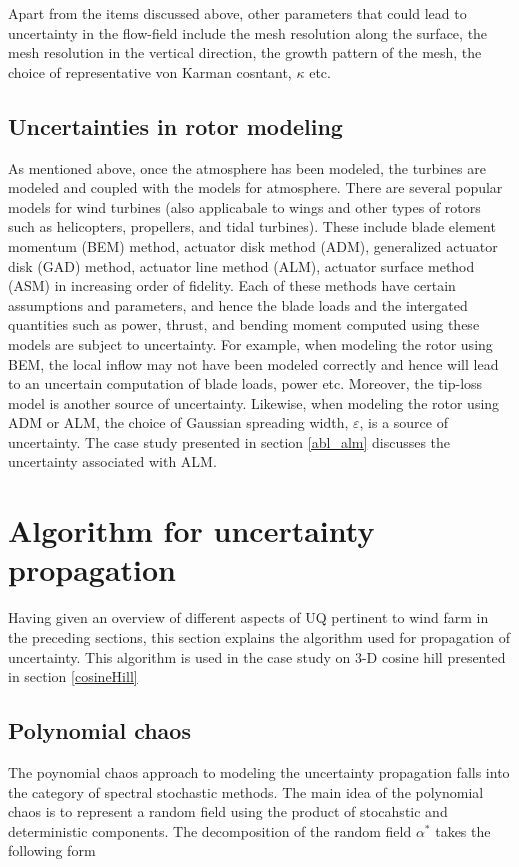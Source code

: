 \documentclass[]{aiaa-tc}%
\begin{document}
Apart from the items discussed above, other parameters that could lead to uncertainty in the flow-field include the mesh resolution along the surface, the mesh resolution in the vertical direction, the growth pattern of the mesh, the choice of representative von Karman cosntant, $\kappa$ etc.
 
\subsection{Uncertainties in rotor modeling}
As mentioned above, once the atmosphere has been modeled, the turbines are modeled and coupled with the models for atmosphere. There are several popular models for wind turbines (also applicabale to wings and other types of rotors such as helicopters, propellers, and tidal turbines). These include blade element momentum (BEM) method, actuator disk method (ADM), generalized actuator disk (GAD) method, actuator line method (ALM), actuator surface method (ASM) in increasing order of fidelity. Each of these methods have certain assumptions and parameters, and hence the blade loads and the intergated quantities such as power, thrust, and bending moment computed using these models are subject to uncertainty. For example, when modeling the rotor using BEM, the local inflow may not have been modeled correctly and hence will lead to an uncertain computation of blade loads, power etc. Moreover, the tip-loss model is another source of uncertainty. Likewise, when modeling the rotor using ADM or ALM, the choice of Gaussian spreading width, $\varepsilon$, is a source of uncertainty. The case study presented in section \ref{abl_alm} discusses the uncertainty associated with ALM.


\section{Algorithm for uncertainty propagation} \label{uq_algo}
Having given an overview of different aspects of UQ pertinent to wind farm in the preceding sections, this section explains the algorithm used for propagation of uncertainty. This algorithm is used in the case study on 3-D cosine hill presented in section \ref{cosineHill}

\subsection{Polynomial chaos} \label{polynomial_chaos}
The poynomial chaos approach to modeling the uncertainty propagation falls into the category of spectral stochastic methods.\cite{hosder:aiaa2010,xiu:jcp2003, xiu:siam2002} The main idea of the polynomial chaos is to represent a random field using the product of stocahstic and deterministic components. The decomposition of the random field $\alpha^*$ takes the following form\cite{hosder:aiaa2010}
\end{document}
